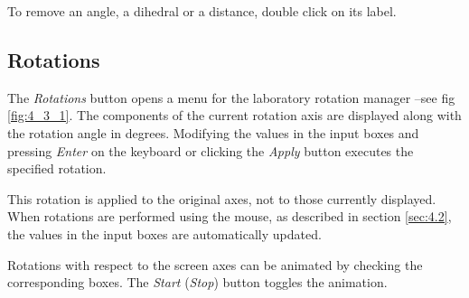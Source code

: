\documentclass[10pt]{article}
\begin{document}
\vspace*{5mm}

To remove an angle, a dihedral or a distance, double click on its 
label.


\subsection{Rotations \label{sec:4.3}}

The {\it Rotations} button opens a menu for the laboratory rotation manager --see fig  
\ref{fig:4_3_1}. The components of the current rotation axis are displayed along  
with the rotation angle in degrees. Modifying the values in the input boxes and  
pressing {\it Enter} on the keyboard or clicking the {\it Apply} button executes the  
specified rotation.  

This rotation is applied to the original axes, not to those currently displayed.  
When rotations are performed using the mouse, as described in section \ref{sec:4.2},  
the values in the input boxes are automatically updated.  

Rotations with respect to the screen axes can be animated  
by checking the corresponding boxes. The {\it Start} ({\it Stop}) button toggles the animation.  
\end{document}
